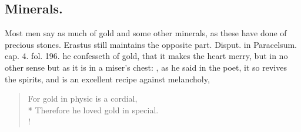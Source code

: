 {\subsection{Minerals.}
Most men say as much of gold and some other minerals, as
these have done of precious stones. Erastus still maintains the
opposite part. \textlatin{Disput. in Paracelsum. cap. 4. fol. 196.} he confesseth
of gold,  that it makes the heart merry, but in no other sense
but as it is in a miser's chest: , as he said in the poet, it so revives the spirits,
and is an excellent recipe against melancholy,
%
{\gothfont
\begin{verse}
For gold in physic is a cordial,\\*
Therefore he loved gold in special.\\!
\end{verse}
}

}

